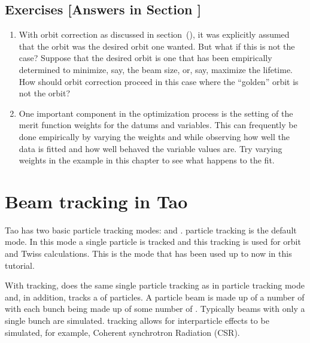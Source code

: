 \documentclass{hitec}     %
\newcommand{\Section}[1]{\section{#1}\vspace*{-1ex}}
\begin{document}
{%
\subsection{Exercises [Answers in Section ]}
\label{s:opt.corr.ex}

\begin{enumerate}[label=\thesection.\arabic{enumi}]
\item
With orbit correction as discussed in section~(), it was explicitly assumed that
the  orbit was the desired orbit one wanted. But what if this is not the case? Suppose
that the desired orbit is one that has been empirically determined to minimize, say, the beam size,
or, say, maximize the lifetime. How should orbit correction proceed in this case where the
``golden'' orbit is not the  orbit?
%
\item
One important component in the optimization process is the setting of the merit function weights for
the datums and variables. This can frequently be done empirically by varying the weights and while
observing how well the data is fitted and how well behaved the variable values are. Try varying
weights in the example in this chapter to see what happens to the fit.
\end{enumerate}

\newpage

\Section{Beam tracking in Tao}
\label{s:beam.tracking}

Tao has two basic particle tracking modes:  and .  particle tracking
is the default mode. In this mode a single particle is tracked and this tracking is used for orbit
and Twiss calculations. This is the mode that has been used up to now in this tutorial.

With  tracking, \tao does the same single particle tracking as in  particle
tracking mode and, in addition, \tao tracks a  of particles. A particle beam is made up of
a number of  with each bunch being made up of some number of . Typically
beams with only a single bunch are simulated.  tracking allows for interparticle effects to
be simulated, for example, Coherent synchrotron Radiation (CSR). 

}
\end{document}
